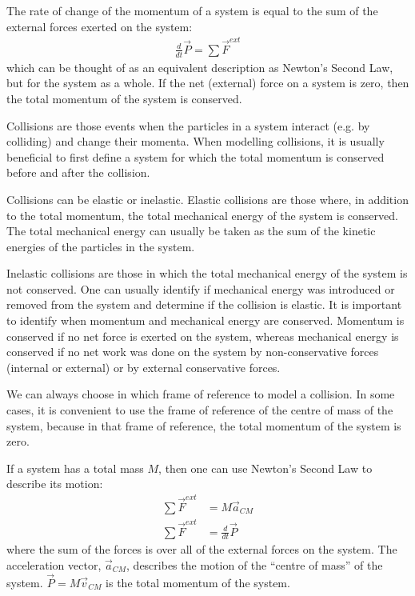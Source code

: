\begin{chapterSummary}
{The rate of change of the momentum of a system is equal to the sum of the external forces exerted on the system:
\begin{align*}
\frac{d}{dt}\vec P = \sum \vec F^{ext}
\end{align*}
which can be thought of as an equivalent description as Newton's Second Law, but for the system as a whole. If the net (external) force on a system is zero, then the total momentum of the system is conserved. 

Collisions are those events when the particles in a system interact (e.g. by colliding) and change their momenta. When modelling collisions, it is usually beneficial to first define a system for which the total momentum is conserved before and after the collision. 

Collisions can be elastic or inelastic. Elastic collisions are those where, in addition to the total momentum, the total mechanical energy of the system is conserved. The total mechanical energy can usually be taken as the sum of the kinetic energies of the particles in the system.

Inelastic collisions are those in which the total mechanical energy of the system is not conserved. One can usually identify if mechanical energy was introduced or removed from the system and determine if the collision is elastic. It is important to identify when momentum and mechanical energy are conserved. Momentum is conserved if no net force is exerted on the system, whereas mechanical energy is conserved if no net work was done on the system by non-conservative forces (internal or external) or by external conservative forces.

We can always choose in which frame of reference to model a collision. In some cases, it is convenient to use the frame of reference of the centre of mass of the system, because in that frame of reference, the total momentum of the system is zero.

If a system has a total mass $M$, then one can use Newton's Second Law to describe its motion:
\begin{align*}
\sum \vec F^{ext} &= M \vec a_{CM}\\
\sum \vec F^{ext} &=\frac{d}{dt} \vec P
\end{align*}
where the sum of the forces is over all of the external forces on the system. The acceleration vector, $\vec a_{CM}$, describes the motion of the ``centre of mass'' of the system. $\vec P=M\vec v_{CM}$ is the total momentum of the system.

}
\end{chapterSummary}
